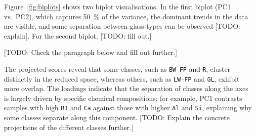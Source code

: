 \documentclass[dtu]{dtuarticle}
\newcommand{\todo}[1]{\color{red}[TODO: #1]\color{black}}
\begin{document}
	Figure~\ref{fig:biplots} shows two biplot visualisations. In the first biplot (PC1 vs.\ PC2), which captures \SI{50}{\percent} of the variance, the dominant trends in the data are visible, and some separation between glass types can be observed \todo{explain}. For the second biplot, \todo{fill out.}

	\todo{Check the paragraph below and fill out further.}

	The projected scores reveal that some classes, such as \texttt{BW-FP} and \texttt{R}, cluster distinctly in the reduced space, whereas others, such as \texttt{LW-FP} and \texttt{GL}, exhibit more overlap. The loadings indicate that the separation of classes along the axes is largely driven by specific chemical compositions; for example, PC1 contrasts samples with high \texttt{RI} and \texttt{Ca} against those with higher \texttt{Al} and \texttt{Si}, explaining why some classes separate along this component. \todo{Explain the concrete projections of the different classes further.}
\end{document}
